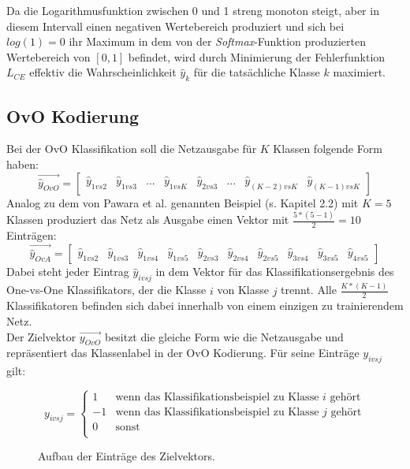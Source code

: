 Da die Logarithmusfunktion zwischen 0 und 1 streng monoton steigt, aber in diesem Intervall einen negativen Wertebereich produziert und sich bei\\ $log(1)=0$ ihr Maximum in dem von der \textit{Softmax}-Funktion produzierten Wertebereich von $[0, 1]$ befindet, wird durch Minimierung der Fehlerfunktion $L_{CE}$ effektiv die Wahrscheinlichkeit $\widehat{y}_k$ für die tatsächliche Klasse $k$ maximiert.


\subsection{OvO Kodierung}
Bei der OvO Klassifikation soll die Netzausgabe für $K$ Klassen folgende Form haben:
\[\overrightarrow{\widehat{y}_{OvO}} = \begin{bmatrix}
\widehat{y}_{1vs2} & \widehat{y}_{1vs3} & ... & \widehat{y}_{1vsK} & \widehat{y}_{2vs3} &... & \widehat{y}_{(K-2)vs K} & \widehat{y}_{(K-1)vsK}
\end{bmatrix} \]
Analog zu dem von Pawara et al. genannten Beispiel (s. \cite{pawaraPaper} Kapitel 2.2) mit $K=5$ Klassen produziert das Netz als Ausgabe einen Vektor mit $\frac{5*(5-1)}{2}=10$ Einträgen:
\[\overrightarrow{\widehat{y}_{OvA}} = \begin{bmatrix}
\widehat{y}_{1vs2} & \widehat{y}_{1vs3} & \widehat{y}_{1vs4} & \widehat{y}_{1vs5} & \widehat{y}_{2vs3} & \widehat{y}_{2vs4} & \widehat{y}_{2vs5} & \widehat{y}_{3vs4} & \widehat{y}_{3vs5} & \widehat{y}_{4vs5}
\end{bmatrix} \]
Dabei steht jeder Eintrag $\widehat{y}_{ivsj}$ in dem Vektor für das Klassifikationsergebnis des One-vs-One Klassifikators, der die Klasse $i$ von Klasse $j$ trennt. Alle $\frac{K*(K-1)}{2}$ Klassifikatoren befinden sich dabei innerhalb von einem einzigen zu trainierendem Netz.\\

Der Zielvektor $\overrightarrow{y_{OvO}}$ besitzt die gleiche Form wie die Netzausgabe und repräsentiert das Klassenlabel in der OvO Kodierung. Für seine Einträge $y_{ivsj}$ gilt:
\begin{figure}[H]
\[
y_{ivsj} = 
\begin{cases}
1 & \text{wenn das Klassifikationsbeispiel zu Klasse } i \text{ gehört}\\
-1 & \text{wenn das Klassifikationsbeispiel zu Klasse } j \text{ gehört}\\
0 & \text{sonst}\\
\end{cases}
\]
\caption{Aufbau der Einträge des Zielvektors.}
\label{gl:OvOZielvektor}
\end{figure}

